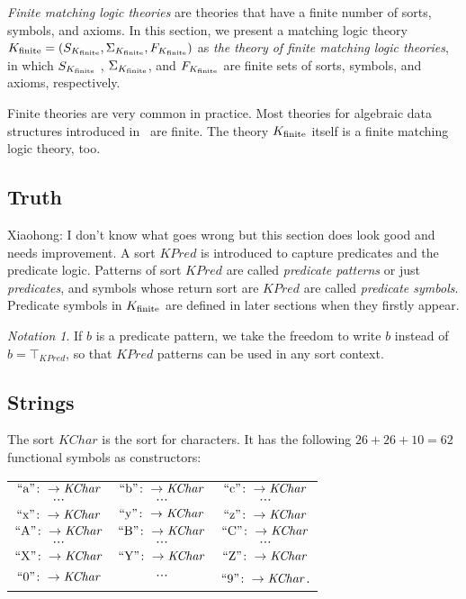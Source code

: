 \documentclass[UTF8,11pt]{article}
\newcounter{thmcounter}
\theoremstyle{plain}
\theoremstyle{definition}
\theoremstyle{remark}
\newtheorem{notation}   [thmcounter]{Notation}
\newcommand{\KPred}{\mathit{KPred}}
\newcommand{\KChar}{\mathit{KChar}}
\newcommand{\quot}[1]{\mathrm{``#1"}}
\begin{document}

\emph{Finite matching logic theories} are theories that have a finite number of sorts, symbols, and axioms.
In this section, we present a matching logic theory ${K_\text{finite}} = ( S_{K_\text{finite}}, \Sigma_{K_\text{finite}}, F_{K_\text{finite}} )$ as \emph{the theory of finite matching logic theories}, in which $S_{K_\text{finite}}$ , $\Sigma_{K_\text{finite}}$, and $F_{K_\text{finite}}$ are finite sets of sorts, symbols, and axioms, respectively.

Finite theories are very common in practice.
Most theories for algebraic data structures introduced in~\cite{rosu-2017-lmcs} are finite. The theory ${K_\text{finite}}$ itself is a finite matching logic theory, too.

\subsection{Truth}
\improvement
{Xiaohong: I don't know what goes wrong but this section does look good and needs improvement.}
A sort $\KPred$ is introduced to capture predicates and the predicate logic.
Patterns of sort $\KPred$ are called \emph{predicate patterns} or just \emph{predicates}, and symbols whose return sort are $\KPred$ are called \emph{predicate symbols}. 
Predicate symbols in ${K_\text{finite}}$ are defined in later sections when they firstly appear.

\begin{notation}
	If $b$ is a predicate pattern, we take the freedom to write $b$ instead of $b = \top_\KPred$, so that $\KPred$ patterns can be used in any sort context.
\end{notation}





\subsection{Strings}
The sort $\KChar$ is the sort for characters. It has the following $26 + 26 + 10 = 62$ functional symbols as constructors:
\begin{center}
	\begin{tabular}{c c c}
		$\quot{a} \colon \to \KChar$ & $\quot{b} \colon \to \KChar$ & $\quot{c} \colon \to \KChar$ \\
		$\cdots$ & $\cdots$ & $\cdots$ \\
		$\quot{x} \colon \to \KChar$ & $\quot{y} \colon \to \KChar$ & $\quot{z} \colon \to \KChar$ \\
		$\quot{A} \colon \to \KChar$ & $\quot{B} \colon \to \KChar$ & $\quot{C} \colon \to \KChar$ \\
		$\cdots$ & $\cdots$ & $\cdots$ \\
		$\quot{X} \colon \to \KChar$ & $\quot{Y} \colon \to \KChar$ & $\quot{Z} \colon \to \KChar$ \\
		$\quot{0} \colon \to \KChar$ & $\cdots$ & $\quot{9} \colon \to \KChar$. 
	\end{tabular}
\end{center}
\end{document}
